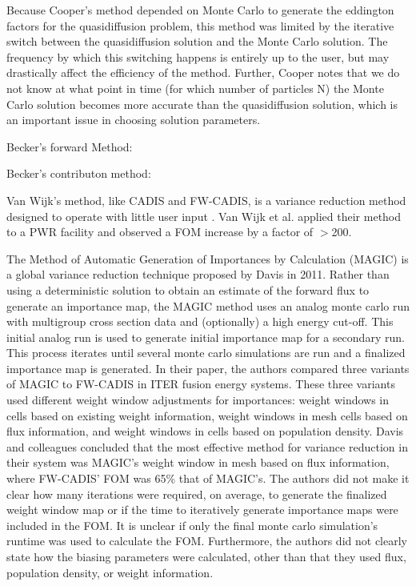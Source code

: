 Because Cooper's method depended on Monte Carlo to generate the eddington factors for the quasidiffusion problem, this method was limited by the iterative switch between the quasidiffusion solution and the Monte Carlo solution. The frequency by which this switching happens is entirely up to the user, but may drastically affect the efficiency of the method. Further, Cooper notes that we do not know at what point in time (for which number of particles N) the Monte Carlo solution becomes more accurate than the quasidiffusion solution, which is an important issue in choosing solution parameters. 

Becker's forward Method: \cite{becker_hybrid_2007}

Becker's contributon method: \cite{becker_hybrid_2009}

Van Wijk's method, like CADIS and FW-CADIS, is a variance reduction method designed to operate with little user input \cite{van_wijk_easy_2011}. 
Van Wijk et al. applied their method to a PWR facility and observed a FOM increase by a factor of $>$200. 


The Method of Automatic Generation of Importances by Calculation (MAGIC) is a global variance reduction technique \cite{davis_comparison_2011} proposed by Davis in 2011. 
Rather than using a deterministic solution to obtain an estimate of the forward flux to generate an importance map, the MAGIC method uses an analog monte carlo run with multigroup cross section data and (optionally) a high energy cut-off.
This initial analog run is used to generate initial importance map for a secondary run.
This process iterates until several monte carlo simulations are run and a finalized importance map is generated. 
In their paper, the authors compared three variants of MAGIC to FW-CADIS in ITER fusion energy systems. 
These three variants used different weight window adjustments for importances: weight windows in cells based on existing weight information, weight windows in mesh cells based on flux information, and weight windows in cells based on population density. 
Davis and colleagues concluded that the most effective method for variance reduction in their system was MAGIC's weight window in mesh based on flux information, where FW-CADIS' FOM was 65\% that of MAGIC's. 
The authors did not make it clear how many iterations were required, on average, to generate the finalized weight window map or if the time to iteratively generate importance maps were included in the FOM. 
It is unclear if only the final monte carlo simulation's runtime was used to calculate the FOM. 
Furthermore, the authors did not clearly state how the biasing parameters were calculated, other than that they used flux, population density, or weight information. 


